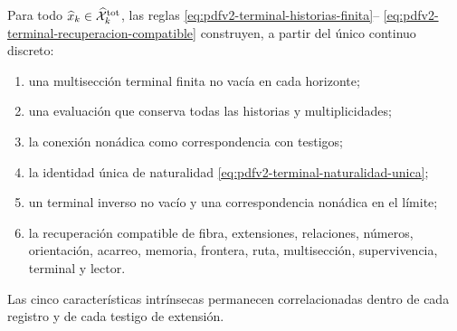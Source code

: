 \begin{theorem}
\label{thm:pdfv2-terminal-conjunto}
Para todo \(\widehat x_k\in\widehat{\mathcal X}^{\rm tot}_k\), las reglas
\eqref{eq:pdfv2-terminal-historias-finita}--
\eqref{eq:pdfv2-terminal-recuperacion-compatible} construyen, a partir del
\'unico continuo discreto:
\begin{enumerate}
 \item una multisecci\'on terminal finita no vac\'ia en cada horizonte;
 \item una evaluaci\'on que conserva todas las historias y multiplicidades;
 \item la conexi\'on non\'adica como correspondencia con testigos;
 \item la identidad \'unica de naturalidad
       \eqref{eq:pdfv2-terminal-naturalidad-unica};
 \item un terminal inverso no vac\'io y una correspondencia non\'adica en el
       l\'imite;
 \item la recuperaci\'on compatible de fibra, extensiones, relaciones,
       n\'umeros, orientaci\'on, acarreo, memoria, frontera, ruta,
       multisecci\'on, supervivencia, terminal y lector.
\end{enumerate}
Las cinco caracter\'isticas intr\'insecas permanecen correlacionadas dentro
de cada registro y de cada testigo de extensi\'on.
\end{theorem}

